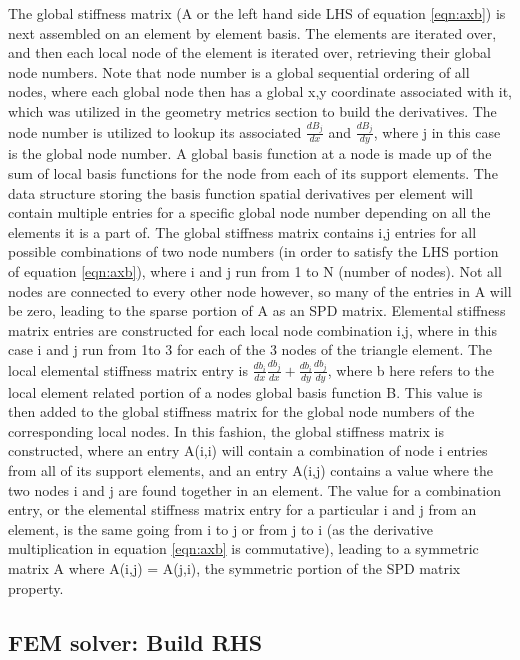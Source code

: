 \documentclass[conf]{new-aiaa}
\begin{document}
The global stiffness matrix (A or the left hand side LHS of equation \ref{eqn:axb}) is next assembled on an element by element basis.  The elements are iterated over, and then each local node of the element is iterated over, retrieving their global node numbers.  Note that node number is a global sequential ordering of all nodes, where each global node then has a global x,y coordinate associated with it, which was utilized in the geometry metrics section to build the derivatives.  The node number is utilized to lookup its associated $\frac{dB_j}{dx}$ and $\frac{dB_j}{dy}$, where j in this case is the global node number.  A global basis function at a node is made up of the sum of local basis functions for the node from each of its support elements.  The data structure storing the basis function spatial derivatives per element will contain multiple entries for a specific global node number depending on all the elements it is a part of.  The global stiffness matrix contains i,j entries for all possible combinations of two node numbers (in order to satisfy the LHS portion of equation \ref{eqn:axb}), where i and j run from 1 to N (number of nodes).  Not all nodes are connected to every other node however, so many of the entries in A will be zero, leading to the sparse portion of A as an SPD matrix.  Elemental stiffness matrix entries are constructed for each local node combination i,j, where in this case i and j run from 1to 3 for each of the 3 nodes of the triangle element.  The local elemental stiffness matrix entry is $\frac{db_i}{dx}\frac{db_j}{dx} + \frac{db_i}{dy}\frac{db_j}{dy}$, where b here refers to the local element related portion of a nodes global basis function B.  This value is then added to the global stiffness matrix for the global node numbers of the corresponding local nodes.  In this fashion, the global stiffness matrix is constructed, where an entry A(i,i) will contain a combination of node i entries from all of its support elements, and an entry A(i,j) contains a value where the two nodes i and j are found together in an element.  The value for a combination entry, or the elemental stiffness matrix entry for a particular i and j from an element, is the same going from i to j or from j to i (as the derivative multiplication in equation \ref{eqn:axb} is commutative), leading to a symmetric matrix A where A(i,j) = A(j,i), the symmetric portion of the SPD matrix property.

\subsection{FEM solver: Build RHS}
\bigskip
\end{document}
